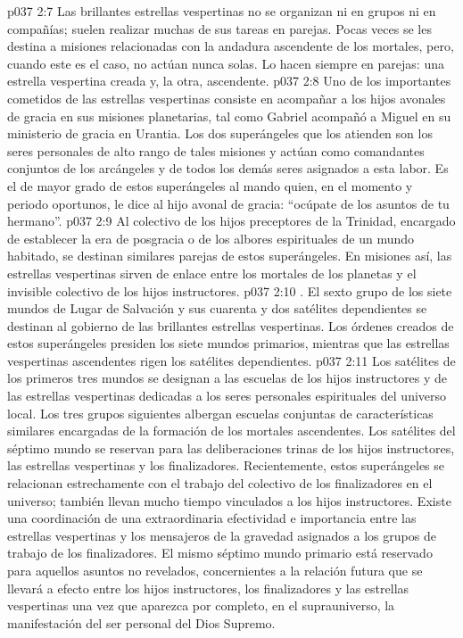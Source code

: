 \vs p037 2:7 Las brillantes estrellas vespertinas no se organizan ni en grupos ni en compañías; suelen realizar muchas de sus tareas en parejas. Pocas veces se les destina a misiones relacionadas con la andadura ascendente de los mortales, pero, cuando este es el caso, no actúan nunca solas. Lo hacen siempre en parejas: una estrella vespertina creada y, la otra, ascendente.
\vs p037 2:8 Uno de los importantes cometidos de las estrellas vespertinas consiste en acompañar a los hijos avonales de gracia en sus misiones planetarias, tal como Gabriel acompañó a Miguel en su ministerio de gracia en Urantia. Los dos superángeles que los atienden son los seres personales de alto rango de tales misiones y actúan como comandantes conjuntos de los arcángeles y de todos los demás seres asignados a esta labor. Es el de mayor grado de estos superángeles al mando quien, en el momento y periodo oportunos, le dice al hijo avonal de gracia: “ocúpate de los asuntos de tu hermano”.
\vs p037 2:9 Al colectivo de los hijos preceptores de la Trinidad, encargado de establecer la era de posgracia o de los albores espirituales de un mundo habitado, se destinan similares parejas de estos superángeles. En misiones así, las estrellas vespertinas sirven de enlace entre los mortales de los planetas y el invisible colectivo de los hijos instructores.
\vs p037 2:10 \pc {}. El sexto grupo de los siete mundos de Lugar de Salvación y sus cuarenta y dos satélites dependientes se destinan al gobierno de las brillantes estrellas vespertinas. Los órdenes creados de estos superángeles presiden los siete mundos primarios, mientras que las estrellas vespertinas ascendentes rigen los satélites dependientes.
\vs p037 2:11 Los satélites de los primeros tres mundos se designan a las escuelas de los hijos instructores y de las estrellas vespertinas dedicadas a los seres personales espirituales del universo local. Los tres grupos siguientes albergan escuelas conjuntas de características similares encargadas de la formación de los mortales ascendentes. Los satélites del séptimo mundo se reservan para las deliberaciones trinas de los hijos instructores, las estrellas vespertinas y los finalizadores. Recientemente, estos superángeles se relacionan estrechamente con el trabajo del colectivo de los finalizadores en el universo; también llevan mucho tiempo vinculados a los hijos instructores. Existe una coordinación de una extraordinaria efectividad e importancia entre las estrellas vespertinas y los mensajeros de la gravedad asignados a los grupos de trabajo de los finalizadores. El mismo séptimo mundo primario está reservado para aquellos asuntos no revelados, concernientes a la relación futura que se llevará a efecto entre los hijos instructores, los finalizadores y las estrellas vespertinas una vez que aparezca por completo, en el suprauniverso, la manifestación del ser personal del Dios Supremo.
